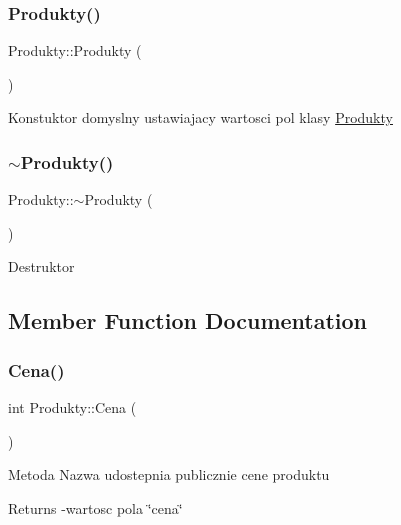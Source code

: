 \subsubsection{\texorpdfstring{Produkty()}{Produkty()}}
{\footnotesize\ttfamily Produkty\+::\+Produkty (\begin{DoxyParamCaption}{ }\end{DoxyParamCaption})\hspace{0.3cm}{\ttfamily [inline]}}

Konstuktor domyslny ustawiajacy wartosci pol klasy \mbox{\hyperlink{class_produkty}{Produkty}} \mbox{\label{class_produkty_a9da830cebdf28e5eebf61590d9d8c0d9}} 
\subsubsection{\texorpdfstring{$\sim$\+Produkty()}{~Produkty()}}
{\footnotesize\ttfamily Produkty\+::$\sim$\+Produkty (\begin{DoxyParamCaption}{ }\end{DoxyParamCaption})\hspace{0.3cm}{\ttfamily [inline]}}

Destruktor 

\subsection{Member Function Documentation}
\mbox{\label{class_produkty_a72fb87d97714d084955c12d6341a376d}} 
\subsubsection{\texorpdfstring{Cena()}{Cena()}}
{\footnotesize\ttfamily int Produkty\+::\+Cena (\begin{DoxyParamCaption}{ }\end{DoxyParamCaption})}

Metoda Nazwa udostepnia publicznie cene produktu \begin{DoxyReturn}{Returns}
-\/wartosc pola \char`\"{}cena\char`\"{} 
\end{DoxyReturn}
\mbox{\label{class_produkty_a0a20cd05ba8aa6a2665a57cc74a2743c}} 
